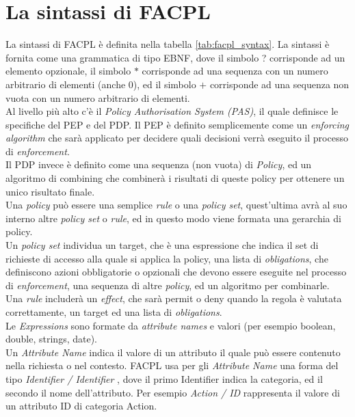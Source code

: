 \section{La sintassi di FACPL}


La sintassi di FACPL è definita nella tabella \ref{tab:facpl_syntax}.
La sintassi è fornita come una grammatica di tipo EBNF, dove il simbolo ? corrisponde ad un elemento opzionale, il simbolo $*$ corrisponde ad una sequenza con un numero arbitrario di elementi (anche 0), ed il simbolo $+$ corrisponde ad una sequenza non vuota con un numero arbitrario di elementi.\\
Al livello più alto c'è il \textit{Policy Authorisation System (PAS)}, il quale definisce le specifiche del PEP e del PDP.
Il PEP è definito semplicemente come un \textit{enforcing algorithm} che sarà applicato per decidere quali decisioni verrà eseguito il processo di \textit{enforcement}. \\
Il PDP invece è definito come una sequenza (non vuota) di \textit{Policy}, ed un algoritmo di combining che combinerà i risultati di queste policy per ottenere un unico risultato finale.\\
Una \textit{policy} può essere una semplice \textit{rule} o una \textit{policy set}, quest'ultima avrà al suo interno altre \textit{policy set} o \textit{rule}, ed in questo modo viene formata una gerarchia di policy.\\
Un \textit{policy set} individua un target, che è una espressione che indica il set di richieste di accesso alla quale si applica la policy, una lista di \textit{obligations}, che definiscono azioni obbligatorie o opzionali che devono essere eseguite nel processo di \textit{enforcement}, una sequenza di altre \textit{policy}, ed un algoritmo per combinarle.\\
Una \textit{rule} includerà un \textit{effect}, che sarà permit o deny quando la regola è valutata correttamente, un target ed una lista di \textit{obligations}.\\
Le \textit{Expressions} sono formate da \textit{attribute names} e valori (per esempio boolean, double, strings, date).\\
Un \textit{Attribute Name} indica il valore di un attributo il quale può essere contenuto nella richiesta o nel contesto. FACPL usa per gli \textit{Attribute Name} una forma del tipo \textit{Identifier / Identifier }, dove il primo Identifier indica la categoria, ed il secondo il nome dell'attributo.
Per esempio \textit{Action / ID} rappresenta il valore di un attributo ID di categoria Action.\\
